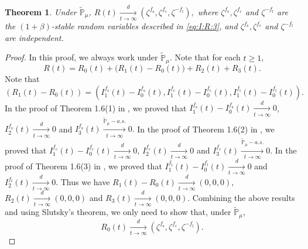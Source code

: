 \documentclass[12pt,a4paper]{amsart}
\theoremstyle{plain}
\newtheorem{thm}{Theorem}[section]
\theoremstyle{definition}
\numberwithin{equation}{section}
\begin{document}
\begin{thm}\label{thm: II}
Under $\mathbb{\widetilde{P}}_{\mu}$,
$
R(t) \xrightarrow[t\rightarrow\infty]{d}(\zeta^{f_\mathrm s},\zeta^{f_\mathrm c},\zeta^{-f_\mathrm l}),
$
where $\zeta^{f_\mathrm s},\zeta^{f_\mathrm c}$ and $\zeta^{-f_\mathrm l}$ are
the $(1+\beta)$-stable random variables described in \eqref{eq:I:R:3}, and $\zeta^{f_\mathrm s},\zeta^{f_\mathrm c}$ and $\zeta^{-f_\mathrm l}$ are independent.
\end{thm}
\begin{proof}
In this proof, we always work under $\mathbb{\widetilde{P}}_{\mu}$.
Note that for each $t\geq 1$,
\[
R(t)=R_0(t)+\big(R_1(t)-R_0(t)\big)+R_2(t)+R_3(t).
\]
Note that
$$
(R_1(t)-R_0(t))=(I_1^{f_\mathrm s}(t)-I_0^{f_\mathrm s}(t), I_1^{f_\mathrm c}(t)-I_0^{f_\mathrm c}(t), I_1^{f_\mathrm l}(t)-I_0^{f_\mathrm l}(t)).
$$
In the proof of Theorem 1.6(1) in \cite{RenSongSunZhao2019Stable}, we proved that
$I_1^{f_\mathrm s}(t)-I_0^{f_\mathrm s}(t)\xrightarrow[t\to \infty]{d} 0$, $I_2^{f_\mathrm s}(t)\xrightarrow[t\to \infty]{d} 0$ and $I_3^{f_\mathrm s}(t)\xrightarrow[t\to \infty]{\mathbb{\widetilde{P}}_{\mu}-a.s.} 0.$
 In the proof of Theorem 1.6(2) in \cite{RenSongSunZhao2019Stable}, we proved that
 $I_1^{f_\mathrm c}(t)-I_0^{f_\mathrm c}(t)\xrightarrow[t\to \infty]{d} 0$, $I_2^{f_\mathrm c}(t)\xrightarrow[t\to \infty]{d} 0$ and $I_3^{f_\mathrm c}(t)\xrightarrow[t\to \infty]{\mathbb{\widetilde{P}}_{\mu}-a.s.} 0.$
In the proof of Theorem 1.6(3) in \cite{RenSongSunZhao2019Stable}, we proved that
$I_1^{f_\mathrm l}(t)-I_0^{f_\mathrm l}(t)\xrightarrow[t\to \infty]{d} 0$ and  $I_2^{f_\mathrm l}(t)\xrightarrow[t\to \infty]{d} 0$.
Thus we have 
$R_1(t)-R_0(t)\xrightarrow[t\to \infty]{d} (0,0,0)$, $R_2(t)\xrightarrow[t\to \infty]{d}(0,0,0)$ and
$R_3(t)\xrightarrow[t\to \infty]{d}(0,0,0)$.
Combining the above results and using Slutsky's theorem, we only need to  show that, under $\mathbb{\widetilde{P}}_{\mu}$,
\begin{equation}
\label{lem:UOT}R_0(t) \xrightarrow[t\to \infty]{d}(\zeta^{f_\mathrm s},\zeta^{f_\mathrm c},\zeta^{-f_\mathrm l}).
\end{equation}


\end{proof}
\end{document}
